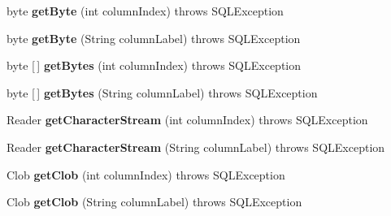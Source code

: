 \begin{DoxyCompactItemize}
\item 
\mbox{\label{classsimpledb_1_1jdbc_1_1ResultSetAdapter_adae2fff3771e9a763579b77f5fe140da}} 
byte {\bfseries get\+Byte} (int column\+Index)  throws S\+Q\+L\+Exception 
\item 
\mbox{\label{classsimpledb_1_1jdbc_1_1ResultSetAdapter_a541051a7793e19f7fb5351e0f90bc3fa}} 
byte {\bfseries get\+Byte} (String column\+Label)  throws S\+Q\+L\+Exception 
\item 
\mbox{\label{classsimpledb_1_1jdbc_1_1ResultSetAdapter_ad24633a5c315c9c0e8f77643078f86be}} 
byte \mbox{[}$\,$\mbox{]} {\bfseries get\+Bytes} (int column\+Index)  throws S\+Q\+L\+Exception 
\item 
\mbox{\label{classsimpledb_1_1jdbc_1_1ResultSetAdapter_a0251e7b1b2f08cc662b36c753ec73268}} 
byte \mbox{[}$\,$\mbox{]} {\bfseries get\+Bytes} (String column\+Label)  throws S\+Q\+L\+Exception 
\item 
\mbox{\label{classsimpledb_1_1jdbc_1_1ResultSetAdapter_a24cacb64f22c7fe159b1e5f993234e29}} 
Reader {\bfseries get\+Character\+Stream} (int column\+Index)  throws S\+Q\+L\+Exception 
\item 
\mbox{\label{classsimpledb_1_1jdbc_1_1ResultSetAdapter_acf467b2b7b42abe8fd11d156c4314a39}} 
Reader {\bfseries get\+Character\+Stream} (String column\+Label)  throws S\+Q\+L\+Exception 
\item 
\mbox{\label{classsimpledb_1_1jdbc_1_1ResultSetAdapter_a878597b9cd3ed21de3fd4c115bb1c343}} 
Clob {\bfseries get\+Clob} (int column\+Index)  throws S\+Q\+L\+Exception 
\item 
\mbox{\label{classsimpledb_1_1jdbc_1_1ResultSetAdapter_a45f55acc2c74e4b8860dd35329f06f92}} 
Clob {\bfseries get\+Clob} (String column\+Label)  throws S\+Q\+L\+Exception 
\item 
\mbox{\label{classsimpledb_1_1jdbc_1_1ResultSetAdapter_af5ff236415c84d47a3bcf35acb375f39}} 

\end{DoxyCompactItemize}
